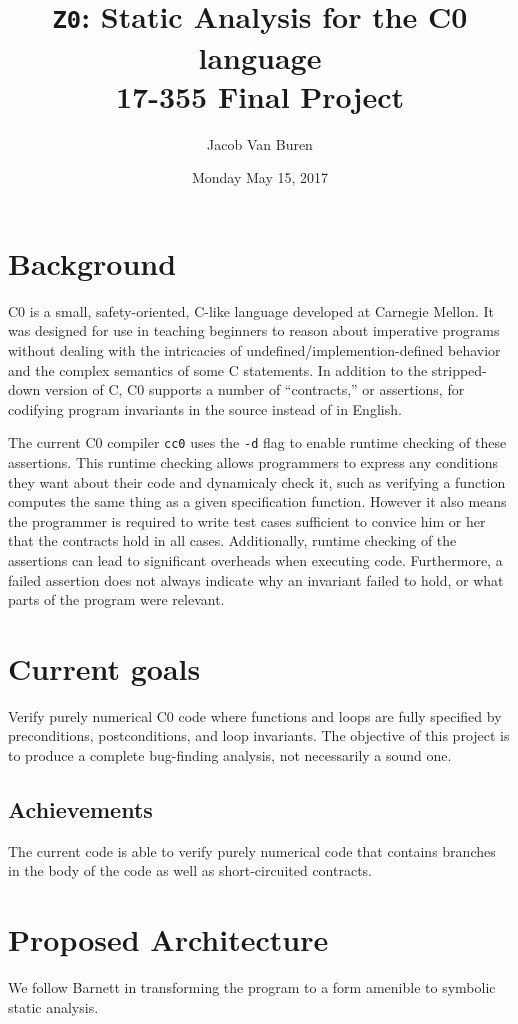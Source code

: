 \documentclass[12pt]{article}
\title{\texttt{Z0}: Static Analysis for the C0 language\\
{\normalsize 17-355 Final Project}}
\author{Jacob Van Buren}
\date{Monday May 15, 2017}
\begin{document}
\maketitle
\section{Background}
C0 is a small, safety-oriented, C-like language developed at Carnegie Mellon. It was designed for use in teaching beginners to reason about imperative programs without dealing  with the intricacies of undefined/implemention-defined behavior and the complex semantics of some C statements.
In addition to the stripped-down version of C, C0 supports a number of ``contracts,'' or assertions, for codifying program invariants in the source instead of in English.

The current C0 compiler \texttt{cc0} uses the \texttt{-d} flag to enable runtime checking of these assertions. This runtime checking allows programmers to express any conditions they want about their code and dynamicaly check it, such as verifying a function computes the same thing as a given specification function. However it also means the programmer is required to write test cases sufficient to convice him or her that the contracts hold in all cases. Additionally, runtime checking of the assertions can lead to significant overheads when executing code. Furthermore, a failed assertion does not always indicate why an invariant failed to hold, or what parts of the program were relevant.


\section{Current goals}
Verify purely numerical C0 code where functions and loops are fully specified by preconditions, postconditions, and loop invariants.
The objective of this project is to produce a complete bug-finding analysis, not necessarily a sound one.

\subsection{Achievements}
The current code is able to verify purely numerical code that contains branches in the body of the code as well as short-circuited contracts.

\section{Proposed Architecture}
We follow Barnett \cite{Barnett:2005:WUP:1108768.1108813} in transforming the program to a form amenible to symbolic static analysis.
\end{document}
